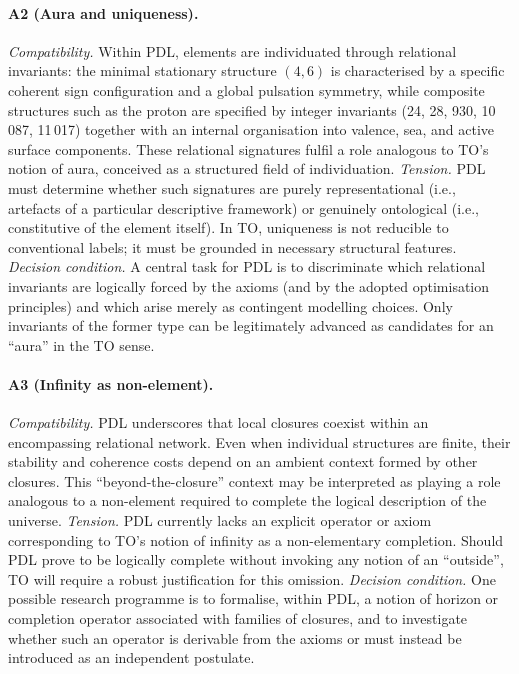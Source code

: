 \documentclass[11pt,a4paper]{article}
\begin{document}
\paragraph{A2 (Aura and uniqueness).}
\emph{Compatibility.} Within PDL, elements are individuated through relational invariants: the minimal stationary structure \((4,6)\) is characterised by a specific coherent sign configuration and a global pulsation symmetry, while composite structures such as the proton are specified by integer invariants (24, 28, 930, 10\,087, 11\,017) together with an internal organisation into valence, sea, and active surface components. These relational signatures fulfil a role analogous to TO's notion of aura, conceived as a structured field of individuation.  
\emph{Tension.} PDL must determine whether such signatures are purely representational (i.e., artefacts of a particular descriptive framework) or genuinely ontological (i.e., constitutive of the element itself). In TO, uniqueness is not reducible to conventional labels; it must be grounded in necessary structural features.  
\emph{Decision condition.} A central task for PDL is to discriminate which relational invariants are logically forced by the axioms (and by the adopted optimisation principles) and which arise merely as contingent modelling choices. Only invariants of the former type can be legitimately advanced as candidates for an ``aura'' in the TO sense.

\paragraph{A3 (Infinity as non-element).}
\emph{Compatibility.} PDL underscores that local closures coexist within an encompassing relational network. Even when individual structures are finite, their stability and coherence costs depend on an ambient context formed by other closures. This ``beyond-the-closure'' context may be interpreted as playing a role analogous to a non-element required to complete the logical description of the universe.  
\emph{Tension.} PDL currently lacks an explicit operator or axiom corresponding to TO's notion of infinity as a non-elementary completion. Should PDL prove to be logically complete without invoking any notion of an ``outside'', TO will require a robust justification for this omission.  
\emph{Decision condition.} One possible research programme is to formalise, within PDL, a notion of horizon or completion operator associated with families of closures, and to investigate whether such an operator is derivable from the axioms or must instead be introduced as an independent postulate.
\end{document}
